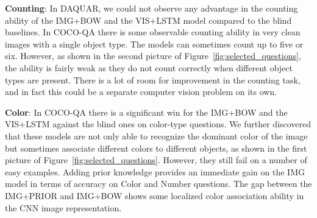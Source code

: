 \documentclass{article} \usepackage{nips15submit_e,times}
\renewcommand{\#}[1]{\textbf{#1}}
\begin{document}
\textbf{Counting}: In DAQUAR, we could not observe any advantage in the
counting ability of the IMG+BOW and the VIS+LSTM model compared to the blind
baselines. In COCO-QA there is some observable counting ability in very clean
images with a single object type. The models can sometimes count up to five or
six. However, as shown in the second picture of
Figure~\ref{fig:selected_questions}, the ability is fairly weak as they do not
count correctly when different object types are present. There is a lot of room
for improvement in the counting task, and in fact this could be a separate
computer vision problem on its own.

\textbf{Color}: In COCO-QA there is a significant win for the IMG+BOW and the
VIS+LSTM against the blind ones on color-type questions. We further discovered
that these models are not only able to recognize the dominant color of the image
but sometimes associate different colors to different objects, as shown in the
first picture of Figure~\ref{fig:selected_questions}. However, they still
fail on a number of easy examples. Adding prior knowledge provides an
immediate gain on the IMG model in terms of accuracy on Color and Number
questions. The gap between the IMG+PRIOR and IMG+BOW shows some localized color
association ability in the CNN image representation.
\end{document}
